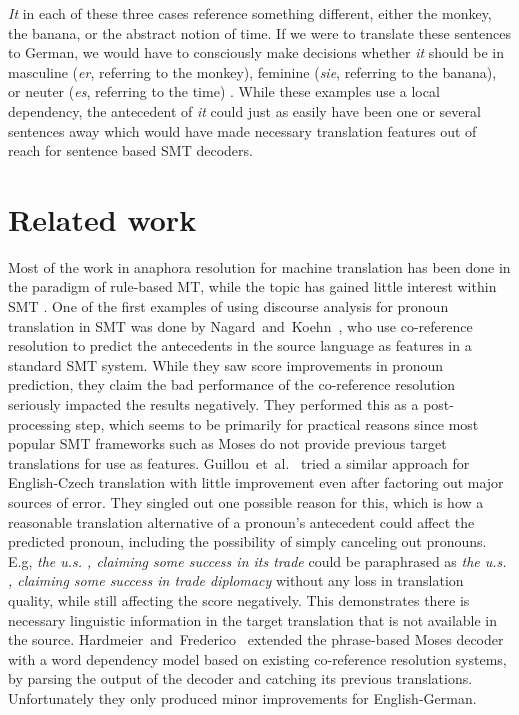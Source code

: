 \documentclass[11pt]{article}
\begin{document}
\emph{It} in each of these three cases reference something different, either the monkey, the banana, or the abstract notion of time. If we were to translate these sentences to German, we would have to consciously make decisions whether \emph{it} should be in masculine (\emph{er}, referring to the monkey), feminine (\emph{sie}, referring to the banana), or neuter (\emph{es}, referring to the time) \cite{Mitkov1995Anaphora}. While these examples use a local dependency, the antecedent of \emph{it} could just as easily have been one or several sentences away which would have made necessary translation features out of reach for sentence based SMT decoders.


\section{Related work}


Most of the work in anaphora resolution for machine translation has been done in the paradigm of rule-based MT, while the topic has gained little interest within SMT \cite{Hardmeier2010Modelling,Mitkov1999Introduction}.
One of the first examples of using discourse analysis for pronoun translation in SMT was done by Nagard~and~Koehn~, who use co-reference resolution to predict the antecedents in the source language as features in a standard SMT system.
While they saw score improvements in pronoun prediction, they claim the bad performance of the co-reference resolution seriously impacted the results negatively.
They performed this as a post-processing step, which seems to be primarily for practical reasons since most popular SMT frameworks such as Moses \cite{Koehn2007Moses} do not provide previous target translations for use as features.
Guillou~et~al.~ tried a similar approach for English-Czech translation with little improvement even after factoring out major sources of error. They singled out one possible reason for this, which is how a reasonable translation alternative of a pronoun's antecedent could affect the predicted pronoun, including the possibility of simply canceling out pronouns. E.g, \emph{the u.s. , claiming some success in its trade} could be paraphrased as \emph{the u.s. , claiming some success in trade diplomacy} without any loss in translation quality, while still affecting the score negatively.
This demonstrates there is necessary linguistic information in the target translation that is not available in the source.
Hardmeier~and~Frederico~ extended the phrase-based Moses decoder with a word dependency model based on existing co-reference resolution systems, by parsing the output of the decoder and catching its previous translations.
Unfortunately they only produced minor improvements for English-German.
\end{document}
